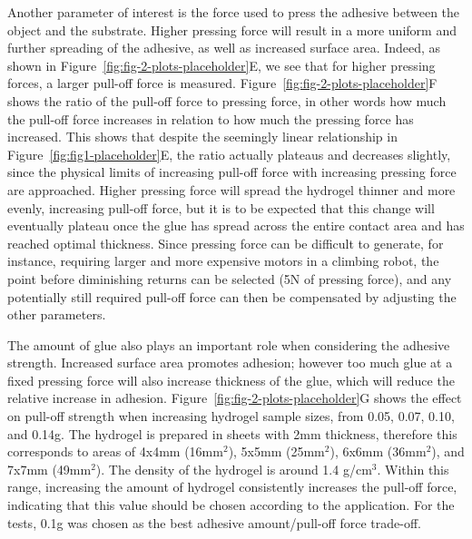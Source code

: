 Another parameter of interest is the force used to press the adhesive between the object and the substrate. Higher pressing force will result in a more uniform and further spreading of the adhesive, as well as increased surface area. Indeed, as shown in Figure~\ref{fig:fig-2-plots-placeholder}E, we see that for higher pressing forces, a larger pull-off force is measured. Figure~\ref{fig:fig-2-plots-placeholder}F shows the ratio of the pull-off force to pressing force, in other words how much the pull-off force increases in relation to how much the pressing force has increased. This shows that despite the seemingly linear relationship in Figure~\ref{fig:fig1-placeholder}E, the ratio actually plateaus and decreases slightly, since the physical limits of increasing pull-off force with increasing pressing force are approached. Higher pressing force will spread the hydrogel thinner and more evenly, increasing pull-off force, but it is to be expected that this change will eventually plateau once the glue has spread across the entire contact area and has reached optimal thickness. Since pressing force can be difficult to generate, for instance, requiring larger and more expensive motors in a climbing robot, the point before diminishing returns can be selected (5N of pressing force), and any potentially still required pull-off force can then be compensated by adjusting the other parameters.

The amount of glue also plays an important role when considering the adhesive strength.  Increased surface area promotes adhesion; however too much glue at a fixed pressing force will also increase thickness of the glue, which will reduce the relative increase in adhesion. Figure~\ref{fig:fig-2-plots-placeholder}G shows the effect on pull-off strength when increasing hydrogel sample sizes, from 0.05, 0.07, 0.10, and 0.14g. The hydrogel is prepared in sheets with 2mm thickness, therefore this corresponds to areas of 4x4mm (16mm$^2$), 5x5mm (25mm$^2$), 6x6mm (36mm$^2$), and 7x7mm (49mm$^2$). The density of the hydrogel is around 1.4 g/cm$^3$. Within this range, increasing the amount of hydrogel consistently increases the pull-off force, indicating that this value should be chosen according to the application. For the tests, 0.1g was chosen as the best adhesive amount/pull-off force trade-off.

